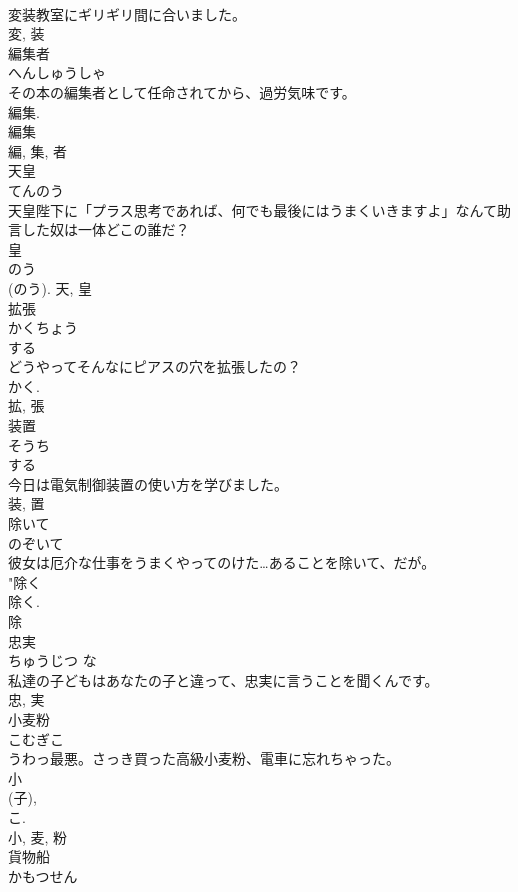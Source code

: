 \documentclass[8pt]{extreport}
\begin{document}
\begin{CJK}{UTF8}{min}
\\	変装教室にギリギリ間に合いました。	
\\	変, 装	
\\	編集者	
\\	へんしゅうしゃ	
\\	その本の編集者として任命されてから、過労気味です。	
\\	編集. 
\\	編集 
\\	編, 集, 者	
\\	天皇	
\\	てんのう	
\\	天皇陛下に「プラス思考であれば、何でも最後にはうまくいきますよ」なんて助言した奴は一体どこの誰だ？	
\\	皇 
\\	のう 
\\	(のう).	天, 皇	
\\	拡張	
\\	かくちょう	
\\	する 
\\	どうやってそんなにピアスの穴を拡張したの？	
\\	かく. 
\\	拡, 張	
\\	装置	
\\	そうち	
\\	する 
\\	今日は電気制御装置の使い方を学びました。	
\\	装, 置	
\\	除いて	
\\	のぞいて	
\\	彼女は厄介な仕事をうまくやってのけた…あることを除いて、だが。	
\\	"除く 
\\	除く. 
\\	除	
\\	忠実	
\\	ちゅうじつ	な 
\\	私達の子どもはあなたの子と違って、忠実に言うことを聞くんです。	
\\	忠, 実	
\\	小麦粉	
\\	こむぎこ	
\\	うわっ最悪。さっき買った高級小麦粉、電車に忘れちゃった。	
\\	小 
\\	(子), 
\\	こ. 
\\	小, 麦, 粉	
\\	貨物船	
\\	かもつせん	

\end{CJK}
\end{document}
